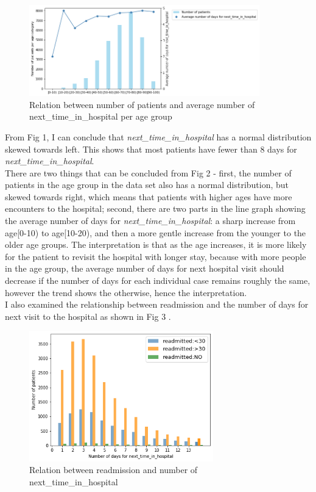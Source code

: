 \documentclass[letterpaper, 12 pt, conference]{ieeeconf}  %
\begin{document}
\begin{figure}[h]
  \includegraphics[width=10cm]{./figs/ave-ntih-inc-trd.png}
  \caption{Relation between number of patients and average number of next\_time\_in\_hospital per age group}
  \label{fig:boat1}
\end{figure}\newline
 From Fig 1, I can conclude that \textit{next\_time\_in\_hospital} has a normal distribution skewed towards left. This shows that most patients have fewer than 8 days for \textit{next\_time\_in\_hospital}. \\\newline
 There are two things that can be concluded from Fig 2 - first, the number of patients in the age group in the data set also has a normal distribution, but skewed towards right, which means that patients with higher ages have more encounters to the hospital; second, there are two parts in the line graph showing the average number of days for \textit{next\_time\_in\_hospital}: a sharp increase from age[0-10) to age[10-20), and then a more gentle increase from the younger to the older age groups. The interpretation is that as the age increases, it is more likely for the patient to revisit the hospital with longer stay, because with more people in the age group, the average number of days for next hospital visit should decrease if the number of days for each individual case remains roughly the same, however the trend shows the otherwise, hence the interpretation. \\\newline
 I also examined the relationship between readmission and the number of days for next visit to the hospital as shown in Fig 3 .\\
 \begin{figure}[h]
  \includegraphics[width=8cm]{./figs/next_t_vs_rd.png}
  \caption{Relation between readmission and number of next\_time\_in\_hospital}
  \label{fig:boat1}
\end{figure}\newline
\end{document}
